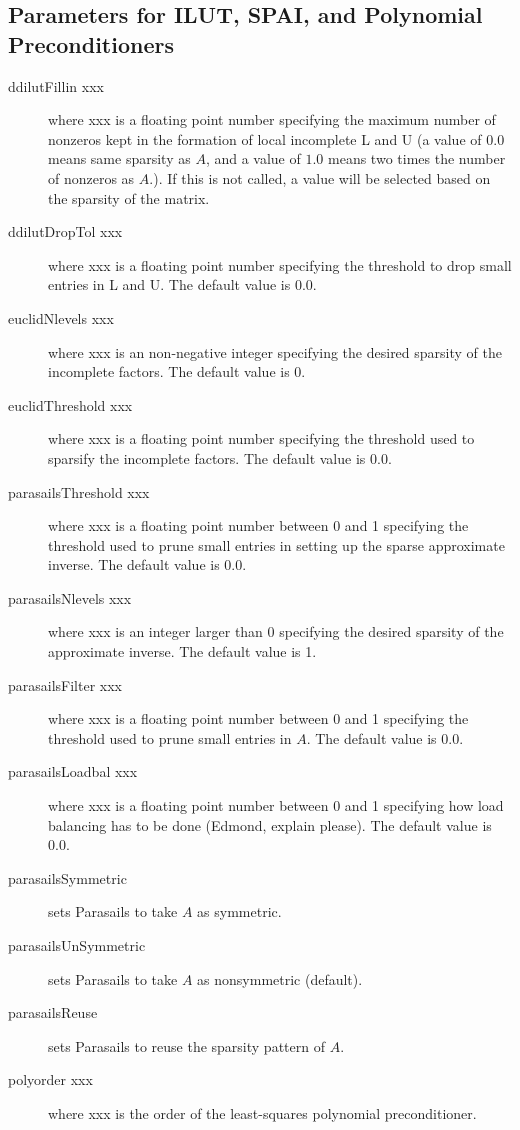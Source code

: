 \subsection{Parameters for ILUT, SPAI, and Polynomial Preconditioners}

\begin{description}
\item[ddilutFillin xxx] where xxx is a floating point number specifying 
           the maximum number of nonzeros kept in the formation of local 
           incomplete L and U (a value of $0.0$ means same sparsity as $A$,
           and a value of $1.0$ means two times the number of nonzeros as
           $A$.).  If this is not called, a value will be selected
           based on the sparsity of the matrix.
\item[ddilutDropTol xxx] where xxx is a floating point number specifying the 
           threshold to drop small entries in L and U.  The default
           value is 0.0.
\item[euclidNlevels xxx] where xxx is an non-negative integer specifying 
           the desired sparsity of the incomplete factors.  The
           default value is 0.
\item[euclidThreshold xxx] where xxx is a floating point number specifying 
           the threshold used to sparsify the incomplete factors.  The default
           value is 0.0.
\item[parasailsThreshold xxx] where xxx is a floating point number between 0 
           and 1 specifying the threshold used to prune small entries
           in setting up the sparse approximate inverse.  The default
           value is 0.0.
\item[parasailsNlevels xxx] where xxx is an integer larger than 0 specifying 
           the desired sparsity of the approximate inverse.  The
           default value is 1.
\item[parasailsFilter xxx] where xxx is a floating point number between 0 
           and 1 specifying the threshold used to prune small entries
           in $A$.  The default value is 0.0.
\item[parasailsLoadbal xxx] where xxx is a floating point number between 0 
           and 1 specifying how load balancing has to be done 
           (Edmond, explain please).  The default value is 0.0.
\item[parasailsSymmetric] sets Parasails to take $A$ as symmetric.
\item[parasailsUnSymmetric] sets Parasails to take $A$ as nonsymmetric
                            (default).
\item[parasailsReuse] sets Parasails to reuse the sparsity pattern of $A$.
\item[polyorder xxx] where xxx is the order of the least-squares polynomial 
           preconditioner.
\end{description}

